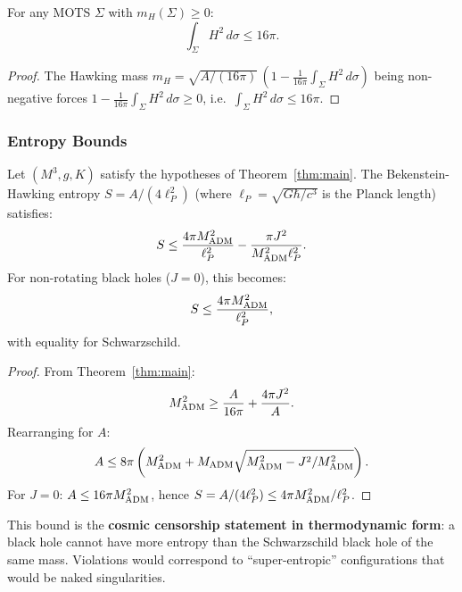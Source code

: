\begin{corollary}\label{cor:area-hawking}
For any MOTS $\Sigma$ with $m_H(\Sigma) \geq 0$:
\begin{equation}
    \int_\Sigma H^2 \, d\sigma \leq 16\pi.
\end{equation}
\end{corollary}
\begin{proof}
The Hawking mass $m_H = \sqrt{A/(16\pi)}\,(1 - \tfrac{1}{16\pi}\int_\Sigma H^2\,d\sigma)$ being non-negative forces $1 - \tfrac{1}{16\pi}\int_\Sigma H^2\,d\sigma \geq 0$, i.e.\ $\int_\Sigma H^2\,d\sigma \leq 16\pi$.
\end{proof}

\subsubsection{Entropy Bounds}

\begin{theorem}\label{thm:entropy-bound}
Let $(M^3, g, K)$ satisfy the hypotheses of Theorem~\ref{thm:main}. The Bekenstein-Hawking entropy $S = A/(4\ell_P^2)$ (where $\ell_P = \sqrt{G\hbar/c^3}$ is the Planck length) satisfies:
\begin{equation}
    S \leq \frac{4\pi M_{\mathrm{ADM}}^2}{\ell_P^2} - \frac{\pi J^2}{M_{\mathrm{ADM}}^2 \ell_P^2}.
\end{equation}
For non-rotating black holes ($J = 0$), this becomes:
\begin{equation}
    S \leq \frac{4\pi M_{\mathrm{ADM}}^2}{\ell_P^2},
\end{equation}
with equality for Schwarzschild.
\end{theorem}

\begin{proof}
From Theorem~\ref{thm:main}:
\[
M_{\mathrm{ADM}}^2 \geq \frac{A}{16\pi} + \frac{4\pi J^2}{A}.
\]
Rearranging for $A$:
\[
A \leq 8\pi\left(M_{\mathrm{ADM}}^2 + M_{\mathrm{ADM}}\sqrt{M_{\mathrm{ADM}}^2 - J^2/M_{\mathrm{ADM}}^2}\right).
\]
For $J = 0$: $A \leq 16\pi M_{\mathrm{ADM}}^2$, hence $S = A/(4\ell_P^2) \leq 4\pi M_{\mathrm{ADM}}^2/\ell_P^2$.
\end{proof}

\begin{remark}
This bound is the \textbf{cosmic censorship statement in thermodynamic form}: a black hole cannot have more entropy than the Schwarzschild black hole of the same mass. Violations would correspond to ``super-entropic'' configurations that would be naked singularities.
\end{remark}

